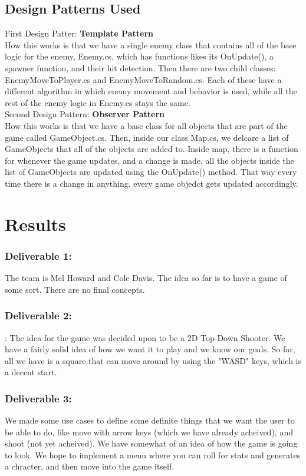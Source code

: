 \documentclass[10pt,conference,onecolumn,compsoc]{IEEEtran}
\begin{document}
\subsection{Design Patterns Used}
First Design Patter: \textbf{Template Pattern} \\
How this works is that we have a single enemy class that contains all of the base logic for the enemy, Enemy.cs, which has functions likes its OnUpdate(), a spawner function, and their hit detection. Then there are two child classes: EnemyMoveToPlayer.cs and EnemyMoveToRandom.cs. Each of these have a different algorithm in which enemy movement and behavior is used, while all the rest of the enemy logic in Enemy.cs stays the same. \\

Second Design Pattern: \textbf {Observer Pattern} \\
How this works is that we have a base class for all objects that are part of the game called GameObject.cs. Then, inside our class Map.cs, we delcare a list of GameObjects that all of the objects are added to. Inside map, there is a function for whenever the game updates, and a change is made, all the objects inside the list of GameObjects are updated using the OnUpdate() method. That way every time there is a change in anything. every game objedct gets updated accordingly.

\section{Results}
\subsubsection*{Deliverable 1:}The team is Mel Howard and Cole Davis. 
The idea so far is to 
have a game of some sort. There are no final concepts.

\subsubsection*{Deliverable 2:}: The idea for the game was decided upon 
to be a 2D Top-Down 
Shooter. We have a fairly solid idea of how we want it to
play and we know our goals. So far, all we have is a square that can move 
around by using the "WASD" keys, which is a decent start.

\subsubsection*{Deliverable 3:} We made some use cases to define some 
definite things that 
we want the user to be able to do, like move with arrow keys
(which we have already acheived), and shoot (not yet acheived). We have 
somewhat of an idea of how the game is going to look. We hope to
implement a menu where you can roll for stats and generates a chracter, and 
then move into the game itself.
\end{document}
